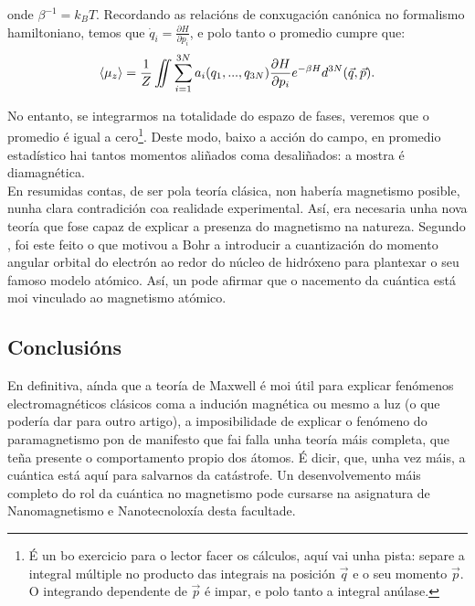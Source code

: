 \begin{refsection}
\begin{multicols}{2}
onde $\beta^{-1} = k_B T$. Recordando as relacións de conxugación canónica no
formalismo hamiltoniano, temos que $\dot q_i = \frac{\partial H}{\partial
p_i}$, e polo tanto o promedio cumpre que:
\begin{equation}
    \braket{\mu_z} = \frac{1}{Z}\iint\sum_{i=1}^{3N} a_i
    (q_1,...,q_{3N}) \frac{\partial H}{\partial p_i}e^{-\beta
    H}d^{3N}(\vec q,\vec p).
\end{equation}

No entanto, se integrarmos na totalidade do espazo de fases, veremos que o
promedio é igual a cero\footnote{É un bo exercicio para o lector facer os
cálculos, aquí vai unha pista: separe a integral múltiple no producto das
integrais na posición $\vec q$ e o seu momento $\vec p$. O integrando
dependente de $\vec p$ é impar, e polo tanto a integral anúlase.}. Deste modo,
baixo a acción do campo, en promedio estadístico hai tantos momentos aliñados
coma desaliñados: a mostra é diamagnética.\\

En resumidas contas, de ser pola teoría clásica, non habería magnetismo
posible, nunha clara contradición coa realidade experimental. Así, era
necesaria unha nova teoría que fose capaz de explicar a presenza do magnetismo
na natureza. Segundo \citet[pp. 354-355]{van-vleck.jh_1977}, foi este feito o
que motivou a Bohr a introducir a cuantización do momento angular orbital do
electrón ao redor do núcleo de hidróxeno para plantexar o seu famoso modelo
atómico. Así, un pode afirmar que o nacemento da cuántica está moi vinculado ao
magnetismo atómico. 

\subsection*{Conclusións}

En definitiva, aínda que a teoría de Maxwell é moi útil para explicar fenómenos
electromagnéticos clásicos coma a indución magnética ou mesmo a luz (o que
podería dar para outro artigo), a imposibilidade de explicar o fenómeno do
paramagnetismo pon de manifesto que fai falla unha teoría máis completa, que
teña presente o comportamento propio dos átomos. É dicir, que, unha vez máis, a
cuántica está aquí para salvarnos da catástrofe. Un desenvolvemento máis
completo do rol da cuántica no magnetismo pode cursarse na asignatura de
Nanomagnetismo e Nanotecnoloxía desta facultade.

\printbibliography

\end{multicols}
\end{refsection}
